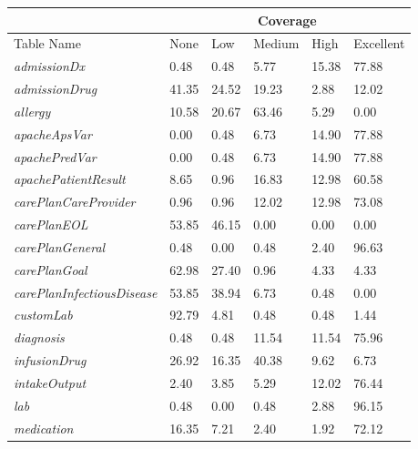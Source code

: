 \documentclass[english]{article}
\newcommand{\tblname}[1]{\emph{#1}}
\begin{document}

\begin{table}
\begin{tabular}{l|p{1.25cm}|p{1.0cm}|p{1.25cm}|p{1.25cm}|p{1.25cm}}
& \multicolumn{5}{c}{Coverage} \\ \hline
Table Name &
None &
Low & %
Medium & %
High & %
Excellent \\ %
\hline
\tblname{admissionDx}                    &  0.48 &  0.48 &  5.77 & 15.38 & 77.88 \\
\tblname{admissionDrug}                  & 41.35 & 24.52 & 19.23 &  2.88 & 12.02 \\
\tblname{allergy}                        & 10.58 & 20.67 & 63.46 &  5.29 &  0.00 \\
\tblname{apacheApsVar}                   &  0.00 &  0.48 &  6.73 & 14.90 & 77.88 \\
\tblname{apachePredVar}                  &  0.00 &  0.48 &  6.73 & 14.90 & 77.88 \\
\tblname{apachePatientResult}            &  8.65 &  0.96 & 16.83 & 12.98 & 60.58 \\
\tblname{carePlanCareProvider}           &  0.96 &  0.96 & 12.02 & 12.98 & 73.08 \\
\tblname{carePlanEOL}                    & 53.85 & 46.15 &  0.00 &  0.00 &  0.00 \\
\tblname{carePlanGeneral}                &  0.48 &  0.00 &  0.48 &  2.40 & 96.63 \\
\tblname{carePlanGoal}                   & 62.98 & 27.40 &  0.96 &  4.33 &  4.33 \\
\tblname{carePlanInfectiousDisease}      & 53.85 & 38.94 &  6.73 &  0.48 &  0.00 \\
\tblname{customLab}                      & 92.79 &  4.81 &  0.48 &  0.48 &  1.44 \\
\tblname{diagnosis}                      &  0.48 &  0.48 & 11.54 & 11.54 & 75.96 \\
\tblname{infusionDrug}                   & 26.92 & 16.35 & 40.38 &  9.62 &  6.73 \\
\tblname{intakeOutput}                   &  2.40 &  3.85 &  5.29 & 12.02 & 76.44 \\
\tblname{lab}                            &  0.48 &  0.00 &  0.48 &  2.88 & 96.15 \\
\tblname{medication}                     & 16.35 &  7.21 &  2.40 &  1.92 & 72.12 \\

\end{tabular}
\end{table}
\end{document}
